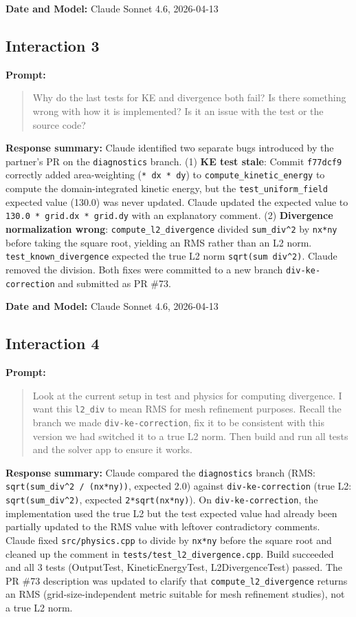 \textbf{Date and Model:} Claude Sonnet 4.6, 2026-04-13

\subsection*{Interaction 3}

\textbf{Prompt:}
\begin{quote}
Why do the last tests for KE and divergence both fail? Is there something wrong with how it is implemented? Is it an issue with the test or the source code?
\end{quote}

\textbf{Response summary:}
Claude identified two separate bugs introduced by the partner's PR on the \texttt{diagnostics} branch.
(1) \textbf{KE test stale}: Commit \texttt{f77dcf9} correctly added area-weighting (\texttt{* dx * dy}) to \texttt{compute\_kinetic\_energy} to compute the domain-integrated kinetic energy, but the \texttt{test\_uniform\_field} expected value (130.0) was never updated. Claude updated the expected value to \texttt{130.0 * grid.dx * grid.dy} with an explanatory comment.
(2) \textbf{Divergence normalization wrong}: \texttt{compute\_l2\_divergence} divided \texttt{sum\_div\^{}2} by \texttt{nx*ny} before taking the square root, yielding an RMS rather than an L2 norm. \texttt{test\_known\_divergence} expected the true L2 norm \texttt{sqrt(sum div\^{}2)}. Claude removed the division. Both fixes were committed to a new branch \texttt{div-ke-correction} and submitted as PR \#73.

\textbf{Date and Model:} Claude Sonnet 4.6, 2026-04-13

\subsection*{Interaction 4}

\textbf{Prompt:}
\begin{quote}
Look at the current setup in test and physics for computing divergence. I want this \texttt{l2\_div} to mean RMS for mesh refinement purposes. Recall the branch we made \texttt{div-ke-correction}, fix it to be consistent with this version we had switched it to a true L2 norm. Then build and run all tests and the solver app to ensure it works.
\end{quote}

\textbf{Response summary:}
Claude compared the \texttt{diagnostics} branch (RMS: \texttt{sqrt(sum\_div\^{}2 / (nx*ny))}, expected 2.0) against \texttt{div-ke-correction} (true L2: \texttt{sqrt(sum\_div\^{}2)}, expected \texttt{2*sqrt(nx*ny)}). On \texttt{div-ke-correction}, the implementation used the true L2 but the test expected value had already been partially updated to the RMS value with leftover contradictory comments. Claude fixed \texttt{src/physics.cpp} to divide by \texttt{nx*ny} before the square root and cleaned up the comment in \texttt{tests/test\_l2\_divergence.cpp}. Build succeeded and all 3 tests (OutputTest, KineticEnergyTest, L2DivergenceTest) passed. The PR \#73 description was updated to clarify that \texttt{compute\_l2\_divergence} returns an RMS (grid-size-independent metric suitable for mesh refinement studies), not a true L2 norm.

